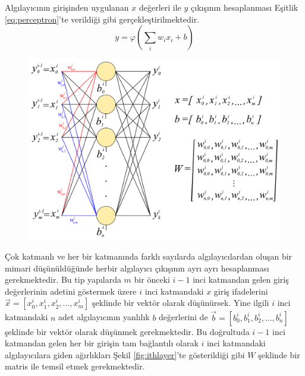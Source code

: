 Algılayıcının girişinden uygulanan $x$ değerleri ile $y$ çıkışının hesaplanması Eşitlik \ref{eq:perceptron}'te verildiği gibi gerçekleştirilmektedir.
\begin{equation}
	\label{eq:perceptron}
	y = \varphi(\sum_{i}w_{i}x_{i} + b)
\end{equation}

\begin{figure}[h!]
	\begin{center}
		\vspace{0.2cm}
		{
			\vspace{0.2cm}
			\includegraphics[scale=0.55]{Yapilan-Calismalar/Figures/ithlayer.pdf}
		}
	\end{center}
\end{figure}

Çok katmanlı ve her bir katmanında farklı sayılarda algılayıcılardan oluşan bir mimari düşünüldüğünde herbir algılayıcı çıkışının ayrı ayrı hesaplanması gerekmektedir. Bu tip yapılarda $m$ bir önceki $i-1$ inci katmandan gelen giriş değerlerinin adetini göstermek üzere $i$ inci katmandaki $x$ giriş ifadelerini $\overset{\rightarrow}{x} = \left[ x_{0}^{i}, x_{1}^{i}, x_{2}^{i},..., x_{m}^{i} \right]$ şeklinde bir vektör olarak düşünürsek. Yine ilgili $i$ inci katmandaki $n$ adet algılayıcının yanlılık $b$ değerlerini de $\overset{\rightarrow}{b} = \left[ b_{0}^{i}, b_{1}^{i}, b_{2}^{i},..., b_{n}^{i} \right]$ şeklinde bir vektör olarak düşünmek gerekmektedir. Bu doğrultuda $i-1$ inci katmandan gelen her bir girişin tam bağlantılı olarak $i$ inci katmandaki algılayıcılara giden ağırlıkları Şekil \ref{fig:ithlayer}'te gösterildiği gibi $W$ şeklinde bir matris ile temsil etmek gerekmektedir.  


